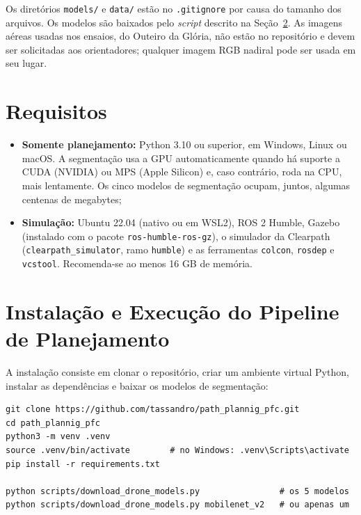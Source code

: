 \documentclass[
    12pt,
    openright,
    oneside,
    a4paper,
    english,
    brazil
]{abntex2}
\begin{document}
\begin{apendicesenv}
Os diretórios \texttt{models/} e \texttt{data/} estão no \texttt{.gitignore} por causa do tamanho dos arquivos. Os modelos são baixados pelo \textit{script} descrito na Seção~\ref{sec:ap_pipeline}. As imagens aéreas usadas nos ensaios, do Outeiro da Glória, não estão no repositório e devem ser solicitadas aos orientadores; qualquer imagem RGB nadiral pode ser usada em seu lugar.

\section{Requisitos}

\begin{itemize}
    \item \textbf{Somente planejamento:} Python 3.10 ou superior, em Windows, Linux ou macOS. A segmentação usa a GPU automaticamente quando há suporte a CUDA (NVIDIA) ou MPS (Apple Silicon) e, caso contrário, roda na CPU, mais lentamente. Os cinco modelos de segmentação ocupam, juntos, algumas centenas de megabytes;
    \item \textbf{Simulação:} Ubuntu 22.04 (nativo ou em WSL2), ROS 2 Humble, Gazebo (instalado com o pacote \texttt{ros-humble-ros-gz}), o simulador da Clearpath (\texttt{clearpath\_\allowbreak{}simulator}, ramo \texttt{humble}) e as ferramentas \texttt{colcon}, \texttt{rosdep} e \texttt{vcstool}. Recomenda-se ao menos 16 GB de memória.
\end{itemize}

\section{Instalação e Execução do Pipeline de Planejamento}
\label{sec:ap_pipeline}

A instalação consiste em clonar o repositório, criar um ambiente virtual Python, instalar as dependências e baixar os modelos de segmentação:

\begin{lstlisting}[style=comandos]
git clone https://github.com/tassandro/path_plannig_pfc.git
cd path_plannig_pfc
python3 -m venv .venv
source .venv/bin/activate        # no Windows: .venv\Scripts\activate
pip install -r requirements.txt

python scripts/download_drone_models.py                # os 5 modelos
python scripts/download_drone_models.py mobilenet_v2   # ou apenas um
\end{lstlisting}


\end{apendicesenv}
\end{document}
